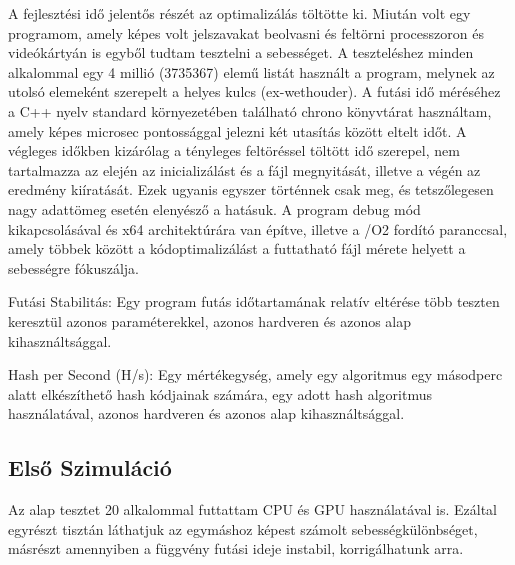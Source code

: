 A fejlesztési idő jelentős részét az optimalizálás töltötte ki. Miután volt egy programom, amely képes volt jelszavakat beolvasni és feltörni processzoron és videókártyán is egyből tudtam tesztelni a sebességet. A teszteléshez minden alkalommal egy 4 millió (\num{3735367}) elemű listát használt a program, melynek az utolsó elemeként szerepelt a helyes kulcs (ex-wethouder).
A futási idő méréséhez a C++ nyelv standard környezetében található chrono könyvtárat használtam, amely képes microsec pontossággal jelezni két utasítás között eltelt időt. A végleges időkben kizárólag a tényleges feltöréssel töltött idő szerepel, nem tartalmazza az elején az inicializálást és a fájl megnyitását, illetve a végén az eredmény kiíratását. Ezek ugyanis egyszer történnek csak meg, és tetszőlegesen nagy adattömeg esetén elenyésző a hatásuk.
A program debug mód kikapcsolásával és x64 architektúrára van építve, illetve a /O2 fordító paranccsal, amely többek között a kódoptimalizálást a futtatható fájl mérete helyett a sebességre fókuszálja.


\begin{definition}
Futási Stabilitás: Egy program futás időtartamának relatív eltérése több teszten keresztül azonos paraméterekkel, azonos hardveren és azonos alap kihasználtsággal.
\end{definition}

\begin{definition}
Hash per Second (H/s): Egy mértékegység, amely egy algoritmus egy másodperc alatt elkészíthető hash kódjainak számára, egy adott hash algoritmus használatával, azonos hardveren és azonos alap kihasználtsággal.
\end{definition}




\subsection{Első Szimuláció}


Az alap tesztet 20 alkalommal futtattam CPU és GPU használatával is. Ezáltal egyrészt tisztán láthatjuk az egymáshoz képest számolt sebességkülönbséget, másrészt amennyiben a függvény futási ideje instabil, korrigálhatunk arra.


